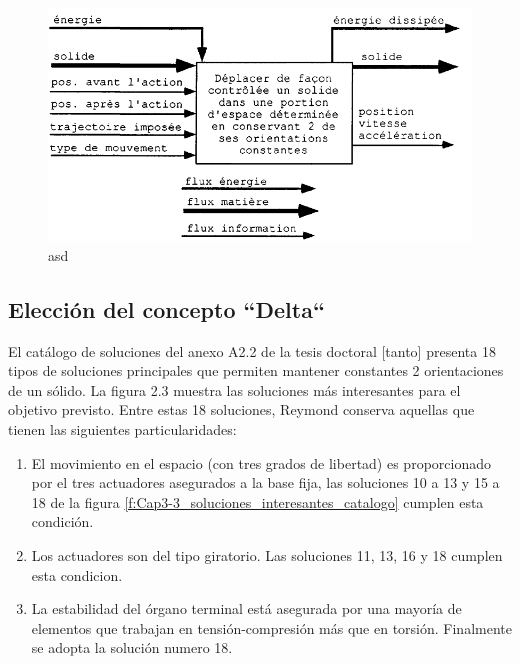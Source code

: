     \begin{figure}[htb]
        \centering
        \includegraphics[width=1\linewidth]{Main/Chapter3/Images3/3-3/caja-negra-reymond.png}
        \caption{asd}
        \label{f:Cap3-3_caja_negra_reymond}
    \end{figure}
    
    
    
    \subsection{Elección del concepto ``Delta``}
    El catálogo de soluciones del anexo A2.2 de la tesis doctoral [tanto] presenta 18 tipos de soluciones principales que permiten mantener constantes 2 orientaciones de un sólido. La figura 2.3 muestra las soluciones más interesantes para el objetivo previsto. Entre estas 18 soluciones, Reymond conserva aquellas que tienen las siguientes particularidades:
    
    \begin{enumerate}
        \item El movimiento en el espacio (con tres grados de libertad) es proporcionado por el tres actuadores asegurados a la base fija, las soluciones 10 a 13 y 15 a 18 de la figura \ref{f:Cap3-3_soluciones_interesantes_catalogo} cumplen esta condición.
        \item Los actuadores son del tipo giratorio. Las soluciones 11, 13, 16 y 18 cumplen esta condicion.
        \item La estabilidad del órgano terminal está asegurada por una mayoría de elementos que trabajan en tensión-compresión más que en torsión. Finalmente se adopta la solución numero 18.
    \end{enumerate}
    
